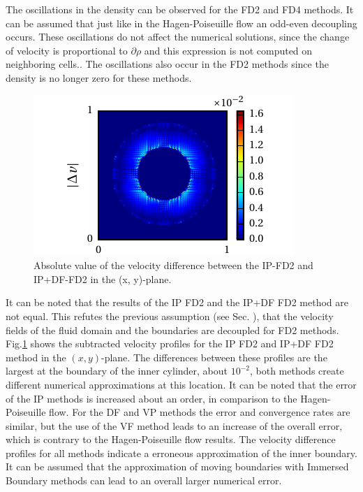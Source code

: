 The oscillations in the density can be observed for the FD2 and FD4 methods.
It can be assumed that just like in the Hagen-Poiseuille flow  an odd-even decoupling occurs.
These oscillations do not affect the numerical solutions, since
the change of velocity is proportional to $\partial \rho$ and this expression is not computed on neighboring cells..
The oscillations also occur in the FD2 methods since the density is no longer zero for these methods.%

\begin{figure}[!bp]
  \begin{minipage}[c]{0.4\textwidth}
      \centering
      \includegraphics{gfx/immersed_boundary/tcflow/discussion/vzdiff.pdf}
  \end{minipage}
  \begin{minipage}[c]{0.6\textwidth}
      \caption{Absolute value of the velocity difference between the IP-FD2 and IP+DF-FD2 in the (x, y)-plane.
      \label{valid:hpflow_velodiff_discussion}
      }
  \end{minipage}
\end{figure}

It can be noted that the results of the IP FD2 and the IP+DF FD2 method are not equal.
This refutes the previous assumption (see Sec. \label{sec:hpflow_discussion}),
that the velocity fields of the fluid domain and the boundaries are decoupled for FD2 methods.
Fig.\ref{valid:hpflow_velodiff_discussion} shows the subtracted velocity profiles for the IP FD2 and IP+DF FD2 method in the $(x, y)$-plane.
The differences between these profiles are the largest at the boundary of the inner cylinder, about $10^{-2}$,
both methods create different numerical approximations at this location.
It can be noted that  the error of the IP methods is increased about an order, in comparison to the Hagen-Poiseuille flow.
For the DF and VP methods the error and convergence rates are similar, but the
use of the VF method leads to an increase of the overall error, which is contrary to the Hagen-Poiseuille flow results.
The velocity difference profiles for all methods indicate a erroneous approximation of the inner boundary.
It can be assumed that the approximation of moving boundaries with Immersed Boundary methods can
lead to an overall larger numerical error.

